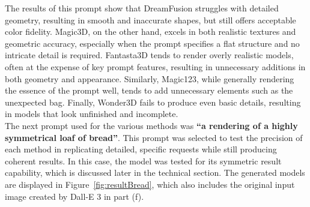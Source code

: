 The results of this prompt show that DreamFusion struggles with detailed geometry, resulting in smooth and inaccurate shapes, but still offers acceptable color fidelity. Magic3D, on the other hand, excels in both realistic textures and geometric accuracy, especially when the prompt specifies a flat structure and no intricate detail is required. Fantasta3D tends to render overly realistic models, often at the expense of key prompt features, resulting in unnecessary additions in both geometry and appearance. Similarly, Magic123, while generally rendering the essence of the prompt well, tends to add unnecessary elements such as the unexpected bag. Finally, Wonder3D fails to produce even basic details, resulting in models that look unfinished and incomplete.\\




The next prompt used for the various methods was \textbf{``a rendering of a highly symmetrical loaf of bread''}. This prompt was selected to test the precision of each method in replicating detailed, specific requests while still producing coherent results. In this case, the model was tested for its symmetric result capability, which is discussed later in the technical section. The generated models are displayed in Figure~\ref{fig:resultBread}, which also includes the original input image created by Dall-E 3 in part (f).

